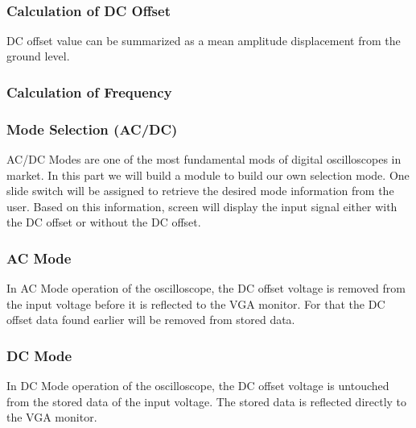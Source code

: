 \documentclass[paper]{IEEEtran}
\begin{document}
\- \\

\subsubsection{Calculation of DC Offset}

	DC offset value can be summarized as a mean amplitude displacement from the ground level.


\subsubsection{Calculation of Frequency}



\subsubsection{Mode Selection (AC/DC)} \- \indent
	AC/DC Modes are one of the most fundamental mods of digital oscilloscopes in market. In this part we will build a module to build our own selection mode. One slide switch will be assigned to retrieve the desired mode information from the user. Based on this information, screen will display the input signal either with the DC offset or without the DC offset.

\subsubsection*{AC Mode} \- \indent
	In AC Mode operation of the oscilloscope, the DC offset voltage is removed from the input voltage before it is reflected to the VGA monitor. For that the DC offset data found earlier will be removed from stored data.

\subsubsection*{DC Mode} \- \indent
	In DC Mode operation of the oscilloscope, the DC offset voltage is untouched from the stored data of the input voltage. The stored data is reflected directly to the VGA monitor. 
	
\end{document}

